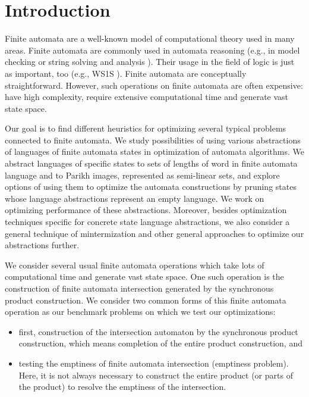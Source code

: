 \chapter{Introduction}


Finite automata are a well-known model of computational theory used in many areas. Finite automata are commonly used in automata reasoning (e.g., in model checking \cite{DBLP:conf/cav/SiegelY20} or string solving and analysis \cite{DBLP:conf/popl/LinB16}). Their usage in the field of logic is just as important, too (e.g., WS1S \cite{DBLP:conf/tacas/FiedorHJLV17, DBLP:journals/acta/FiedorHLV19}). Finite automata are conceptually straightforward. However, such operations on finite automata are often expensive: have high complexity, require extensive computational time and generate vast state space.

Our goal is to find different heuristics for optimizing several typical problems connected to finite automata. We study possibilities of using various abstractions of languages of finite automata states in optimization of automata algorithms. We abstract languages of specific states to sets of lengths of word in finite automata language and to Parikh images, represented as semi-linear sets, and explore options of using them to optimize the automata constructions by pruning states whose language abstractions represent an empty language. We work on optimizing performance of these abstractions. Moreover, besides optimization techniques specific for concrete state language abstractions, we also consider a general technique of mintermization and other general approaches to optimize our abstractions further.

We consider several usual finite automata operations which take lots of computational time and generate vast state space. One such operation is the construction of finite automata intersection generated by the synchronous product construction. We consider two common forms of this finite automata operation as our benchmark problems on which we test our optimizations:
\begin{itemize}
    \item first, construction of the intersection automaton by the synchronous product construction, which means completion of the entire product construction, and
    \item testing the emptiness of finite automata intersection (emptiness problem). Here, it is not always necessary to construct the entire product (or parts of the product) to resolve the emptiness of the intersection.
\end{itemize}

